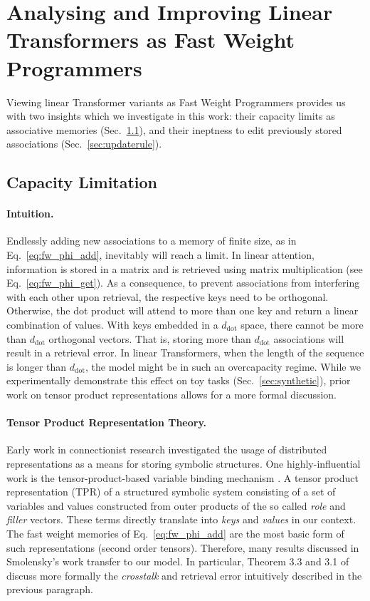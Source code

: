 \documentclass{article}
\theoremstyle{definition}
\begin{document}
\section{Analysing and Improving Linear Transformers as Fast Weight Programmers}
Viewing linear Transformer variants as Fast Weight Programmers provides us with two insights which we investigate in this work:
their capacity limits as associative memories (Sec.~\ref{sec:capacity}), 
and their ineptness to edit previously stored associations (Sec.~\ref{sec:updaterule}).

\subsection{Capacity Limitation}
\label{sec:capacity}
\paragraph{Intuition.}
Endlessly adding new associations to a memory of finite size, as in Eq.~\ref{eq:fw_phi_add}, inevitably will reach a limit. 
In linear attention, information is stored in a matrix and is retrieved using matrix multiplication (see Eq.~\ref{eq:fw_phi_get}).
As a consequence, to prevent associations from interfering with each other upon retrieval, the respective keys need to be orthogonal. 
Otherwise, the dot product will attend to more than one key and return a linear combination of values.
With keys embedded in a $d_\text{dot}$ space, there cannot be more than $d_\text{dot}$ orthogonal vectors.
That is, storing more than $d_\text{dot}$ associations will result in a retrieval error. 
In linear Transformers, when the length of the sequence is longer than $d_\text{dot}$,
the model might be in such an overcapacity regime.
While we experimentally demonstrate this effect on toy tasks (Sec.~\ref{sec:synthetic}), prior work on tensor product representations allows for a more formal discussion.

\paragraph{Tensor Product Representation Theory.}
Early work in connectionist research investigated the usage of distributed representations as a means for storing symbolic structures. 
One highly-influential work is the tensor-product-based variable binding mechanism \citep{smolensky1990tensor}.
A tensor product representation (TPR) of a structured symbolic system consisting
of a set of variables and values constructed
from outer products of the so called \textit{role} and \textit{filler} vectors.
These terms directly translate into \textit{keys} and \textit{values} in our context.
The fast weight memories of Eq.~\ref{eq:fw_phi_add} are the most
basic form of such representations (second order tensors).
Therefore, many results discussed in Smolensky's work transfer to our model.
In particular, Theorem 3.3 and 3.1 of \citet{smolensky1990tensor} discuss more formally the \textit{crosstalk} and retrieval error intuitively described in the previous paragraph.
\end{document}
